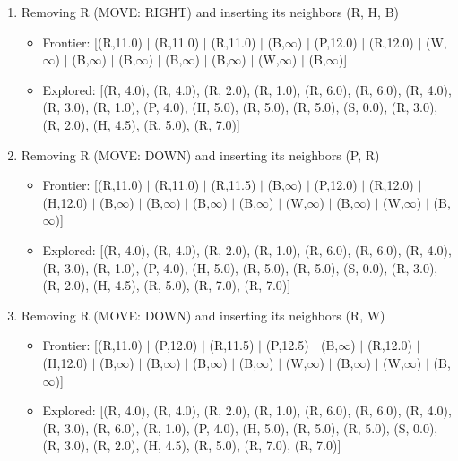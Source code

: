 \documentclass[12pt]{article}
\begin{document}
\begin{enumerate}
\item Removing R (MOVE: RIGHT) and inserting its neighbors (R, H, B)
\begin{itemize}
\item Frontier: [(R,11.0) \(|\) (R,11.0) \(|\) (R,11.0) \(|\) (B,\(\infty\)) \(|\) (P,12.0) \(|\) (R,12.0) \(|\) (W,\(\infty\)) \(|\) (B,\(\infty\)) \(|\) (B,\(\infty\)) \(|\) (B,\(\infty\)) \(|\) (B,\(\infty\)) \(|\) (W,\(\infty\)) \(|\) (B,\(\infty\))]
\item Explored: [(R, 4.0), (R, 4.0), (R, 2.0), (R, 1.0), (R, 6.0), (R, 6.0), (R, 4.0), (R, 3.0), (R, 1.0), (P, 4.0), (H, 5.0), (R, 5.0), (R, 5.0), (S, 0.0), (R, 3.0), (R, 2.0), (H, 4.5), (R, 5.0), (R, 7.0)]
\end{itemize}

\item Removing R (MOVE: DOWN) and inserting its neighbors (P, R)
\begin{itemize}
\item Frontier: [(R,11.0) \(|\) (R,11.0) \(|\) (R,11.5) \(|\) (B,\(\infty\)) \(|\) (P,12.0) \(|\) (R,12.0) \(|\) (H,12.0) \(|\) (B,\(\infty\)) \(|\) (B,\(\infty\)) \(|\) (B,\(\infty\)) \(|\) (B,\(\infty\)) \(|\) (W,\(\infty\)) \(|\) (B,\(\infty\)) \(|\) (W,\(\infty\)) \(|\) (B,\(\infty\))]
\item Explored: [(R, 4.0), (R, 4.0), (R, 2.0), (R, 1.0), (R, 6.0), (R, 6.0), (R, 4.0), (R, 3.0), (R, 1.0), (P, 4.0), (H, 5.0), (R, 5.0), (R, 5.0), (S, 0.0), (R, 3.0), (R, 2.0), (H, 4.5), (R, 5.0), (R, 7.0), (R, 7.0)]
\end{itemize}

\item Removing R (MOVE: DOWN) and inserting its neighbors (R, W)
\begin{itemize}
\item Frontier: [(R,11.0) \(|\) (P,12.0) \(|\) (R,11.5) \(|\) (P,12.5) \(|\) (B,\(\infty\)) \(|\) (R,12.0) \(|\) (H,12.0) \(|\) (B,\(\infty\)) \(|\) (B,\(\infty\)) \(|\) (B,\(\infty\)) \(|\) (B,\(\infty\)) \(|\) (W,\(\infty\)) \(|\) (B,\(\infty\)) \(|\) (W,\(\infty\)) \(|\) (B,\(\infty\))]
\item Explored: [(R, 4.0), (R, 4.0), (R, 2.0), (R, 1.0), (R, 6.0), (R, 6.0), (R, 4.0), (R, 3.0), (R, 6.0), (R, 1.0), (P, 4.0), (H, 5.0), (R, 5.0), (R, 5.0), (S, 0.0), (R, 3.0), (R, 2.0), (H, 4.5), (R, 5.0), (R, 7.0), (R, 7.0)]
\end{itemize}


\end{enumerate}
\end{document}
